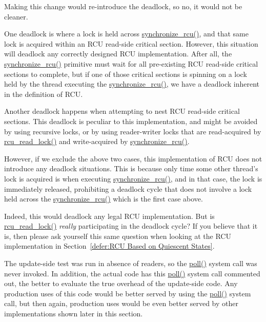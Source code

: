 	Making this change would re-introduce the deadlock, so
	no, it would not be cleaner.


	One deadlock is where a lock is
	held across \url{synchronize_rcu()}, and that same lock is
	acquired within an RCU read-side critical section.
	However, this situation will deadlock any correctly designed
	RCU implementation.
	After all, the \url{synchronize_rcu()} primitive must wait for all
	pre-existing RCU read-side critical sections to complete,
	but if one of those critical sections is spinning on a lock
	held by the thread executing the \url{synchronize_rcu()},
	we have a deadlock inherent in the definition of RCU.

	Another deadlock happens when attempting to nest RCU read-side
	critical sections.
	This deadlock is peculiar to this implementation, and might
	be avoided by using recursive locks, or by using reader-writer
	locks that are read-acquired by \url{rcu_read_lock()} and
	write-acquired by \url{synchronize_rcu()}.

	However, if we exclude the above two cases,
	this implementation of RCU does not introduce any deadlock
	situations.
	This is because only time some other thread's lock is acquired is when
	executing \url{synchronize_rcu()}, and in that case, the lock
	is immediately released, prohibiting a deadlock cycle that
	does not involve a lock held across the \url{synchronize_rcu()}
	which is the first case above.


	Indeed, this would deadlock any legal RCU implementation.
	But is \url{rcu_read_lock()} \emph{really} participating in
	the deadlock cycle?
	If you believe that it is, then please
	ask yourself this same question when looking at the
	RCU implementation in
	Section~\ref{defer:RCU Based on Quiescent States}.


	The update-side test was run in absence of readers, so the
	\url{poll()} system call was never invoked.
	In addition, the actual code has this \url{poll()}
	system call commented out, the better to evaluate the
	true overhead of the update-side code.
	Any production uses of this code would be better served by
	using the \url{poll()} system call, but then again,
	production uses would be even better served by other implementations
	shown later in this section.

